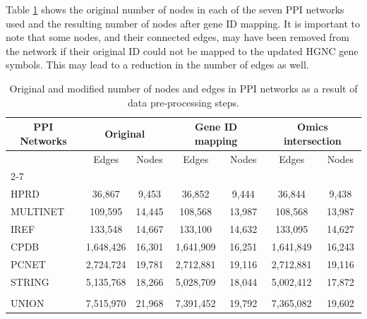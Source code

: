 Table \ref{tab:translate_table} shows the original number of nodes in each of the seven PPI networks used and the resulting number of nodes after gene ID mapping. It is important to note that some nodes, and their connected edges, may have been removed from the network if their original ID could not be mapped to the updated HGNC gene symbols. This may lead to a reduction in the number of edges as well.



\begin{table}[!ht]
\centering
\caption{Original and modified number of nodes and edges in PPI networks as a result of data pre-processing steps. \label{tab:translate_table}}
\begin{tabular}{lcccccc}
\hline
\multicolumn{1}{c}{PPI Networks} & \multicolumn{2}{c}{Original}                & \multicolumn{2}{c}{Gene ID mapping}     & \multicolumn{2}{c}{Omics intersection}   \\ \hline
                                 & Edges                & Nodes                & Edges                & Nodes                & Edges                & Nodes                \\ \cline{2-7} 
                                 & \multicolumn{1}{l}{} & \multicolumn{1}{l}{} & \multicolumn{1}{l}{} & \multicolumn{1}{l}{} & \multicolumn{1}{l}{} & \multicolumn{1}{l}{} \\
HPRD                             & 36,867               & 9,453                & 36,852               & 9,444                & 36,844               & 9,438                \\
MULTINET                         & 109,595              & 14,445               & 108,568              & 13,987               & 108,568              & 13,987               \\
IREF                             & 133,548              & 14,667               & 133,100              & 14,632               & 133,095              & 14,627               \\
CPDB                             & 1,648,426            & 16,301               & 1,641,909            & 16,251               & 1,641,849            & 16,243               \\
PCNET                            & 2,724,724            & 19,781               & 2,712,881            & 19,116               & 2,712,881            & 19,116               \\
STRING                           & 5,135,768            & 18,266               & 5,028,709            & 18,044               & 5,002,412            & 17,872               \\
                                 & \multicolumn{1}{l}{} & \multicolumn{1}{l}{} & \multicolumn{1}{l}{} & \multicolumn{1}{l}{} & \multicolumn{1}{l}{} & \multicolumn{1}{l}{} \\
UNION                            & 7,515,970            & 21,968               & 7,391,452            & 19,792               & 7,365,082            & 19,602               \\ \hline
\end{tabular}
\end{table}


